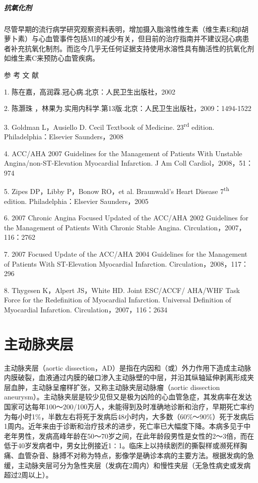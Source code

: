 \paragraph{抗氧化剂}

尽管早期的流行病学研究观察资料表明，增加摄入脂溶性维生素（维生素E和β胡萝卜素）与心血管事件包括MI的减少有关，但目前的治疗指南并不建议冠心病患者补充抗氧化制剂。而迄今几乎无任何证据支持使用水溶性具有酶活性的抗氧化剂如维生素C来预防心血管疾病。

\protect\hypertarget{text00313.html}{}{}

\hypertarget{text00313.htmlux5cux23CHP10-8-3}{}
参 考 文 献

1. 陈在嘉，高润霖.冠心病.北京：人民卫生出版社，2002

2. 陈灏珠
，林果为.实用内科学.第13版.北京：人民卫生出版社，2009：1494-1522

3. Goldman L，Ausiello D. Cecil Textbook of Medicine.
23\textsuperscript{rd} edition. Philadelphia：Elsevier Saunders，2008

4. ACC/AHA 2007 Guidelines for the Management of Patients With Unstable
Angina/non-ST-Elevation Myocardial Infarction. J Am Coll
Cardiol，2008，51：974

5. Zipes DP，Libby P，Bonow RO，et al. Braunwald's Heart Disease
7\textsuperscript{th} edition. Philadelphia：Elsevier Saunders，2005

6. 2007 Chronic Angina Focused Updated of the ACC/AHA 2002 Guidelines
for the Management of Patients With Chronic Stable Angina.
Circulation，2007，116：2762

7. 2007 Focused Update of the ACC/AHA 2004 Guidelines for the Management
of Patients With ST-Elevation Myocardial Infarction.
Circulation，2008，117：296

8. Thygesen K，Alpert JS，White HD. Joint ESC/ACCF/ AHA/WHF Task Force
for the Redefinition of Myocardial Infarction. Universal Definition of
Myocardial Infarction. Circulation，2007，116：2634

\protect\hypertarget{text00314.html}{}{}

\chapter{主动脉夹层}

主动脉夹层（aortic
dissection，AD）是指在内因和（或）外力作用下造成主动脉内膜破裂，血液通过内膜的破口渗入主动脉壁的中层，并沿其纵轴延伸剥离形成夹层血肿，主动脉呈瘤样扩张，又称主动脉夹层动脉瘤（aortic
dissection
aneurysm）。主动脉夹层是较少见但又是极为凶险的心血管急症，其发病率在发达国家可达每年100～200/100万人，未能得到及时准确地诊断和治疗，早期死亡率约为每小时1\%，半数左右将死于发病后48小时内，大多数（60\%～90\%）死于发病后1周内。近年来由于诊断和治疗技术的进步，死亡率已大幅度下降。本病多见于中老年男性，发病高峰年龄在50～70岁之间，在此年龄段男性是女性的2～3倍，而在低于40岁发病者中，男女比例接近1∶1。临床上以持续剧烈的撕裂样或濒死样胸痛、血管杂音、脉搏不对称为特点，影像学是确诊本病的主要方法。根据发病的急缓，主动脉夹层可分为急性夹层（发病在2周内）和慢性夹层（无急性病史或发病超过2周以上）。


